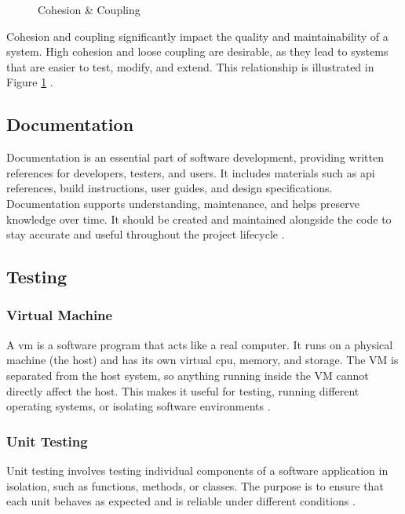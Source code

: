 {\begin{figure}[h!]
    \caption[Cohesion \& Coupling]{Cohesion \& Coupling \cite{geeksforgeeks:c&c}}
    \label{fig:cohesion-coupling}
\end{figure}

Cohesion and coupling significantly impact the quality and maintainability of a system.
High cohesion and loose coupling are desirable, as they lead to systems that are easier to test, modify, and extend. This relationship is illustrated in Figure \ref{fig:cohesion-coupling} 
\cite{geeksforgeeks:c&c}.

\subsection{Documentation}
\label{subsec:documentation}

Documentation is an essential part of software development, providing written references for developers, testers, and users. It includes materials such as \gls{api} references, build instructions, user guides, and design specifications. Documentation supports understanding, maintenance, and helps preserve knowledge over time. It should be created and maintained alongside the code to stay accurate and useful throughout the project lifecycle \cite{geeksforgeeks:doc}.

\subsection{Testing}
\label{subsec:testing}

\subsubsection*{Virtual Machine}
\label{subsubsec:virtual-machine}

A \gls{vm} is a software program that acts like a real computer. It runs on a physical machine (the host) and has its own virtual \gls{cpu}, memory, and storage. The VM is separated from the host system, so anything running inside the VM cannot directly affect the host. This makes it useful for testing, running different operating systems, or isolating software environments \cite{microsoft:virtual-machine}.

\subsubsection*{Unit Testing}
\label{subsubsec:unit-testing}

Unit testing involves testing individual components of a software application in isolation, such as functions, methods, or classes. The purpose is to ensure that each unit behaves as expected and is reliable under different conditions \cite{geeksforgeeks:unit-test}.

}
